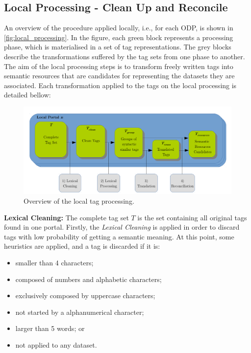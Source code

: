 \subsection{Local Processing - Clean Up and Reconcile}
\label{sec:local_building}

An overview of the procedure applied locally, i.e., for each ODP, is shown in \autoref{fig:local_processing}.
In the figure, each green block represents a processing phase, which is materialised in a set of tag representations. 
The grey blocks describe the transformations suffered by the tag sets from one phase to another.
The aim of the local processing steps is to transform freely written tags into semantic resources that are candidates for representing the datasets they are associated.
Each transformation applied to the tags on the local processing is detailed bellow:

\begin{figure}[tb]
\begin{center}
\includegraphics[scale=0.7]{images/local_processing.pdf}
\caption[Overview of the local tag processing.]{Overview of the local tag processing.}
\label{fig:local_processing}
\end{center}
\end{figure}

\noindent \textbf{Lexical Cleaning: }The complete tag set $T$ is the set containing all original tags found in one portal.
Firstly, the \emph{Lexical Cleaning} is applied in order to discard tags with low probability of getting a semantic meaning.
At this point, some heuristics are applied, and a tag is discarded if it is: 
\begin{itemize}
	\item smaller than 4 characters; 
	\item composed of numbers and alphabetic characters;
	\item exclusively composed by uppercase characters;
	\item not started by a alphanumerical character;
	\item larger than 5 words; or
	\item not applied to any dataset.
\end{itemize}

